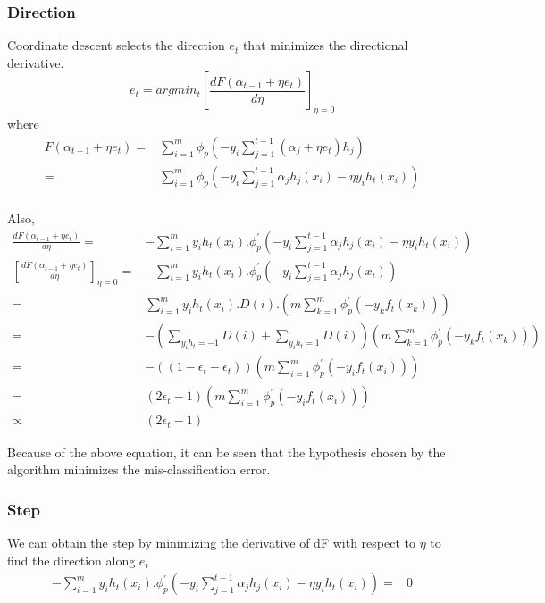 \documentclass{article}
\begin{document}
\subsubsection*{Direction}
Coordinate descent selects the direction $e_{t}$ that minimizes the directional derivative.
\begin{equation*}
  e_{t} = argmin_{t}{[\frac{dF(\alpha_{t-1} + \eta e_{t} )}{d\eta}]}_{\eta = 0}
\end{equation*}
where 
\begin{align*}
  F(\alpha_{t-1} + \eta e_{t} ) = & \sum_{i=1}^{m} \phi_{p} \left( -y_{i}\sum_{j=1}^{t-1} (\alpha_{j} + \eta e_{t})h_{j} \right) \\
  = & \sum_{i=1}^{m} \phi_{p} \left( -y_{i}\sum_{j=1}^{t-1} \alpha_{j}h_{j}(x_{i}) - \eta y_{i}h_{t}(x_{i}) \right)\\
\end{align*}

Also,
\begin{align*}
  \frac{dF(\alpha_{t-1} + \eta e_{t} )}{d\eta} = & -\sum_{i=1}^{m} y_{i}h_{t}(x_{i}).\phi^{'}_{p} \left( -y_{i}\sum_{j=1}^{t-1} \alpha_{j}h_{j}(x_{i}) - \eta y_{i}h_{t}(x_{i}) \right) \\
  {\left[\frac{dF(\alpha_{t-1} + \eta e_{t} )}{d\eta}\right]}_{\eta = 0} = & -\sum_{i=1}^{m} y_{i}h_{t}(x_{i}).\phi^{'}_{p} \left( -y_{i}\sum_{j=1}^{t-1} \alpha_{j}h_{j}(x_{i})\right) \\
  = & \sum_{i=1}^{m} y_{i}h_{t}(x_{i}).D(i).\left(m\sum_{k=1}^{m} \phi^{'}_{p}(-y_{k}f_{t}(x_{k})) \right) \\
  = & -\left(\sum_{y_{i}h_{t} = -1}D(i) + \sum_{y_{i}h_{t} = 1} D(i) \right) \left(m \sum_{k=1}^{m} \phi^{'}_{p}(-y_{k}f_{t}(x_{k}))\right) \\
  = & -\left( (1 - \epsilon_{t} - \epsilon_{t}) \right) \left( m\sum_{i = 1}^{m}\phi^{'}_{p} (-y_{i}f_{t}(x_{i})) \right) \\
  = & (2\epsilon_{t} - 1)\left( m\sum_{i = 1}^{m}\phi^{'}_{p} (-y_{i}f_{t}(x_{i})) \right) \\
  \varpropto & (2\epsilon_{t} - 1)
\end{align*}

Because of the above equation, it can be seen that the hypothesis chosen by the algorithm minimizes the mis-classification error.

\subsubsection*{Step}
We can obtain the step by minimizing the derivative of dF with respect to $\eta$ to find the direction along $e_{t}$
\begin{align*}
  -\sum_{i=1}^{m} y_{i}h_{t}(x_{i}).\phi^{'}_{p} \left( -y_{i}\sum_{j=1}^{t-1} \alpha_{j}h_{j}(x_{i}) - \eta y_{i}h_{t}(x_{i}) \right) = & 0 \\
\end{align*}
\end{document}
